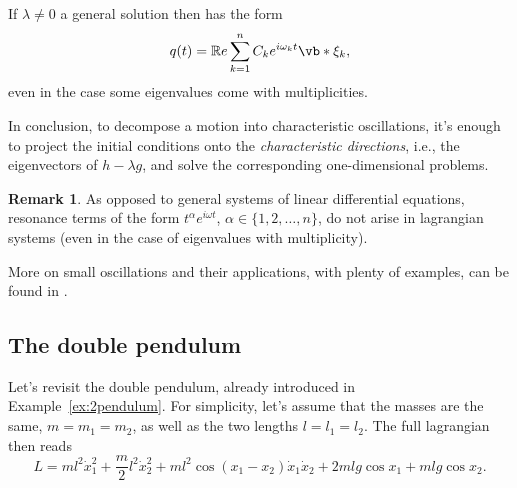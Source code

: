 \documentclass[english,fontsize=11pt,paper=b5]{scrbook}
\numberwithin{equation}{chapter}
\theoremstyle{definition}
\newtheorem{remark}{Remark}[chapter]
\begin{document}
    If $\lambda\neq 0$ a general solution then has the form
    \begin{equation}
      q(t) = \mathbb{R}e \sum_{k=1}^n C_k e^{i \omega_k t}\vb*{\xi}_k,
    \end{equation}
    even in the case some eigenvalues come with multiplicities.

    In conclusion, to decompose a motion into characteristic oscillations, it's enough to project the initial conditions onto the \emph{characteristic directions}, i.e., the eigenvectors of $h - \lambda g$, and solve the corresponding one-dimensional problems.

    \begin{remark}
      As opposed to general systems of linear differential equations, resonance terms of the form $t^\alpha e^{i \omega t}$, $\alpha\in\big\{1,2,\ldots,n\big\}$, do not arise in lagrangian systems (even in the case of eigenvalues with multiplicity).
    \end{remark}

    More on small oscillations and their applications, with plenty of examples, can be found in \cite[Chapters 23--25]{book:arnold}.

    \subsection{The double pendulum}
    Let's revisit the double pendulum, already introduced in Example~\ref{ex:2pendulum}.
    For simplicity, let's assume that the masses are the same, $m = m_1 = m_2$, as well as the two lengths $l = l_1 = l_2$.
    The full lagrangian then reads
    \begin{equation}
      L = m l^2 \dot x_1^2
      + \frac m2 l^2 \dot x_2^2
      + m l^2 \cos(x_1 -x_2)\dot x_1 \dot x_2
      + 2ml g \cos x_1
      + mlg\cos x_2.
    \end{equation}
\end{document}
